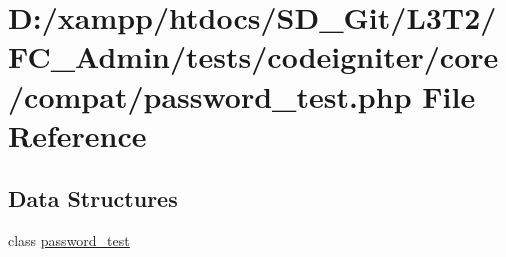 \hypertarget{_admin_2tests_2codeigniter_2core_2compat_2password__test_8php}{}\section{D\+:/xampp/htdocs/\+S\+D\+\_\+\+Git/\+L3\+T2/\+F\+C\+\_\+\+Admin/tests/codeigniter/core/compat/password\+\_\+test.php File Reference}
\label{_admin_2tests_2codeigniter_2core_2compat_2password__test_8php}
\subsection*{Data Structures}
\begin{DoxyCompactItemize}
\item 
class \hyperlink{classpassword__test}{password\+\_\+test}
\end{DoxyCompactItemize}
